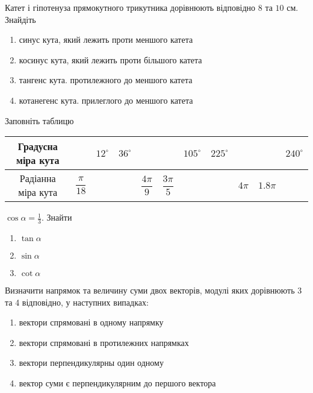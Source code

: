 \justifying
\begin{problem}{1}
	Катет і гіпотенуза прямокутного трикутника дорівнюють відповідно $8$ та $10$ см. Знайдіть
	\begin{multicols}{2}
		\begin{enumerate} 
			\item 
			синус кута, який лежить проти меншого катета
			\item 
			косинус кута, який лежить проти більшого катета
			\item 
			тангенс кута. протилежного до меншого катета
			\item 
			котанегенс кута. прилеглого до меншого катета
		\end{enumerate} 
	\end{multicols}
\end{problem}


\begin{problem}{2}
	Заповніть таблицю
	\begin{table}[h!]
		\centering
		\begin{tabular}{|c|c|c|c|c|c|c|c|c|c|c|}
			\hline
			Градусна міра кута &                   & $12^{\circ}$ & $36^{\circ}$ &                   &                   & $105^{\circ}$ & $225^{\circ}$ &        &          & $240^{\circ}$ \\ \hline
			Радіанна міра кута & $\dfrac{\pi}{18}$ &              &              & $\dfrac{4\pi}{9}$ & $\dfrac{3\pi}{5}$ &               &               & $4\pi$ & $1.8\pi$ &               \\ \hline
		\end{tabular}
	\end{table}
\end{problem}

\begin{problem}{3}
	$\cos \alpha = \frac{1}{3}$. Знайти
	\begin{multicols}{2}
		\begin{enumerate} 
			\item 
			$\tan \alpha$
			\item 
			$\sin \alpha$
			\item 
			$\cot \alpha$
		\end{enumerate} 
	\end{multicols}
\end{problem}

\begin{problem}{4}
	Визначити напрямок та величину суми двох векторів, модулі яких дорівнюють 3 та 4 відповідно, у наступних випадках:
	\begin{enumerate}
		\item
		вектори спрямовані в одному напрямку
		\item
		вектори спрямовані в протилежних напрямках
		\item
		вектори перпендикулярны один одному
		\item
		вектор суми є перпендикулярним до першого вектора
	\end{enumerate}
\end{problem}

